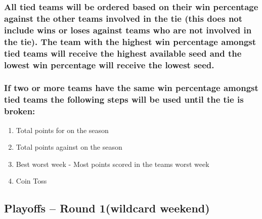 \documentclass[
]{book}
\providecommand{\tightlist}{%
  \setlength{\itemsep}{0pt}\setlength{\parskip}{0pt}}
\begin{document}
\hypertarget{all-tied-teams-will-be-ordered-based-on-their-win-percentage-against-the-other-teams-involved-in-the-tie-this-does-not-include-wins-or-loses-against-teams-who-are-not-involved-in-the-tie.-the-team-with-the-highest-win-percentage-amongst-tied-teams-will-receive-the-highest-available-seed-and-the-lowest-win-percentage-will-receive-the-lowest-seed.}{%
\subsubsection{All tied teams will be ordered based on their win percentage against the other teams involved in the tie (this does not include wins or loses against teams who are not involved in the tie). The team with the highest win percentage amongst tied teams will receive the highest available seed and the lowest win percentage will receive the lowest seed.}\label{all-tied-teams-will-be-ordered-based-on-their-win-percentage-against-the-other-teams-involved-in-the-tie-this-does-not-include-wins-or-loses-against-teams-who-are-not-involved-in-the-tie.-the-team-with-the-highest-win-percentage-amongst-tied-teams-will-receive-the-highest-available-seed-and-the-lowest-win-percentage-will-receive-the-lowest-seed.}}

\hypertarget{if-two-or-more-teams-have-the-same-win-percentage-amongst-tied-teams-the-following-steps-will-be-used-until-the-tie-is-broken}{%
\subsubsection{If two or more teams have the same win percentage amongst tied teams the following steps will be used until the tie is broken:}\label{if-two-or-more-teams-have-the-same-win-percentage-amongst-tied-teams-the-following-steps-will-be-used-until-the-tie-is-broken}}

\begin{enumerate}
\def\labelenumi{\arabic{enumi}.}
\tightlist
\item
  Total points for on the season\\
\item
  Total points against on the season
\item
  Best worst week - Most points scored in the teams worst week
\item
  Coin Toss
\end{enumerate}

\hypertarget{playoffs-round-1wildcard-weekend}{%
\subsection{Playoffs -- Round 1(wildcard weekend)}\label{playoffs-round-1wildcard-weekend}}
\end{document}
